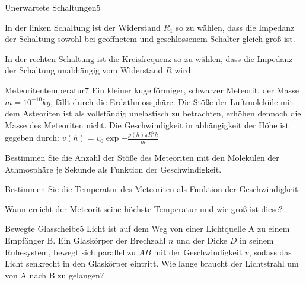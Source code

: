 \begin{problem}{Unerwartete Schaltungen}{5}
 \begin{abcenum}
  \item In der linken Schaltung ist der Widerstand $R_1$ so zu wählen, dass die Impedanz der Schaltung sowohl bei geöffnetem und geschlossenem Schalter gleich groß ist.
  \item In der rechten Schaltung ist die Kreisfrequenz so zu wählen, dass die Impedanz der Schaltung unabhängig vom Widerstand $R$ wird.
 \end{abcenum}
\end{problem}

\begin{problem}{Meteoritentemperatur}{7}
Ein kleiner kugelförmiger, schwarzer Meteorit, der Masse $m=10^{-10}\unit{kg}$, fällt durch die Erdathmossphäre. Die Stöße der Luftmoleküle mit dem Asteoriten ist als vollständig unelastisch zu betrachten, erhöhen dennoch die Masse des Meteoriten nicht. Die Geschwindigkeit in abhängigkeit der Höhe ist gegeben durch: $v(h)=v_0\exp{-\frac{\rho(h)\pi R^2h}{m}}$
 \begin{abcenum}
  \item Bestimmen Sie die Anzahl der Stöße des Meteoriten mit den Molekülen der Athmosphäre je Sekunde als Funktion der Geschwindigkeit.
  \item Bestimmen Sie die Temperatur des Meteoriten als Funktion der Geschwindigkeit.
  \item Wann ereicht der Meteorit seine höchste Temperatur und wie groß ist diese?
 \end{abcenum}
\end{problem}

\begin{problem}{Bewegte Glasscheibe}{5}
Licht ist auf dem Weg von einer Lichtquelle A zu einem Empfänger B. Ein Glaskörper der Brechzahl $n$ und der Dicke $D$ in seinem Ruhesystem, bewegt sich parallel zu $\overline{AB}$ mit der Geschwindigkeit $v$, sodass das Licht senkrecht in den Glaskörper eintritt. Wie lange braucht der Lichtstrahl um von A nach B zu gelangen?
\end{problem}

